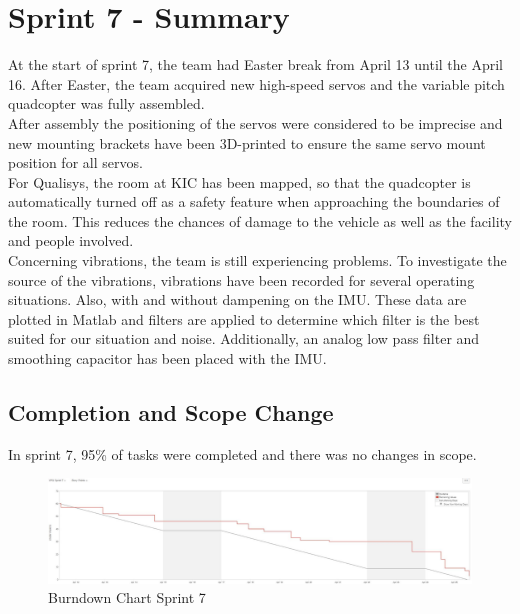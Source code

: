 \chapter{Sprint 7 - Summary}

At the start of sprint 7, the team had Easter break from April 13 until the April 16. After Easter, the team acquired new high-speed servos and the variable pitch quadcopter was fully assembled. \\ 

After assembly the positioning of the servos were considered to be imprecise and new mounting brackets have been 3D-printed to ensure the same servo mount position for all servos.\\

For Qualisys, the room at KIC has been mapped, so that the quadcopter is automatically turned off as a safety feature when approaching the boundaries of the room. This reduces the chances of damage to the vehicle as well as the facility and people involved. \\

Concerning vibrations, the team is still experiencing problems. To investigate the source of the vibrations, vibrations have been recorded for several operating situations. Also, with and without dampening on the IMU. These data are plotted in Matlab and filters are applied to determine which filter is the best suited for our situation and noise. Additionally, an analog low pass filter and smoothing capacitor has been placed with the IMU.  


\section{Completion and Scope Change}

In sprint 7, 95\% of tasks were completed and there was no changes in scope. 


\begin{figure}[H]
    \centering
         \includegraphics[width = 1\textwidth]{VAPIQ-PICTURES/BDSprint7}
      \caption{Burndown Chart Sprint 7}
    \label{fig:bds7}
\end{figure} 

